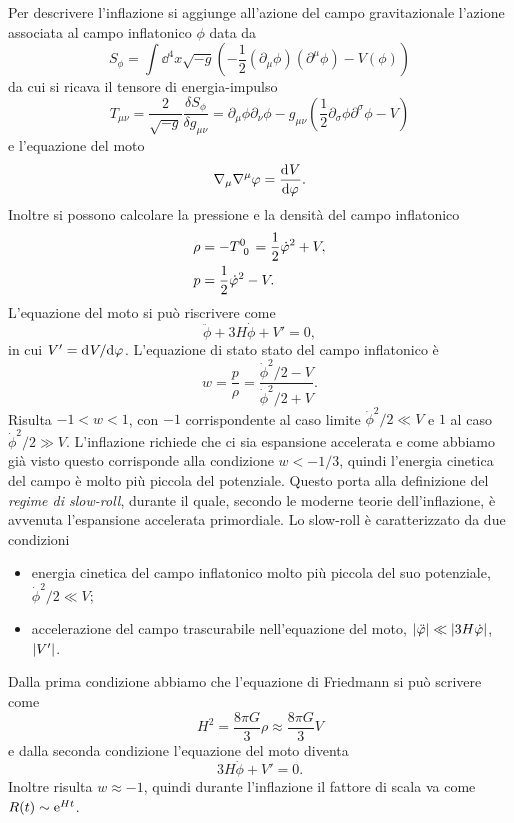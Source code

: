 Per descrivere l'inflazione si aggiunge all'azione del campo gravitazionale
l'azione associata al campo inflatonico \(\phi\) data da
\begin{equation}
  S_{\phi} = \int\dd^{4}x
  \sqrt{-g}\left(-\frac{1}{2}(\partial_{\mu}\phi)(\partial^{\mu}\phi) -
    V(\phi)\right)
\end{equation}
da cui si ricava il tensore di energia-impulso
\begin{equation}
  T_{\mu\nu} = \frac{2}{\sqrt{-g}} \frac{\delta S_{\phi}}{\delta g_{\mu\nu}}
  = \partial_{\mu}\phi \partial_{\nu}\phi -
  g_{\mu\nu}\left(\frac{1}{2}\partial_{\sigma}\phi \partial^{\sigma}\phi -
    V\right)
\end{equation}
e l'equazione del moto
\begin{equation}
  \nabla_{\mu}\nabla^{\mu}\varphi = \frac{{\mathop{}\!\mathrm{d}^{}}V}{\mathop{}\!\mathrm{d} {\varphi}^{}}.
\end{equation}
Inoltre si possono calcolare la pressione e la densità del campo inflatonico
\begin{align}
  \rho &= -\tensor{T}{^{0}_{0}} = \frac{1}{2}\dot{\phi}^{2} + V, \\
  p &= \frac{1}{2}\dot{\phi}^{2} - V.
\end{align}
L'equazione del moto si può riscrivere come
\begin{equation}
  \ddot{\phi} + 3H\dot{\phi} + V' = 0,
\end{equation}
in cui \(V' = \mathrm{d}^{}V / \mathrm{d} {\varphi}^{}\).  L'equazione di stato stato del campo
inflatonico è
\begin{equation}
  w = \frac{p}{\rho} = \frac{\dot{\phi}^{2}/2 - V}{\dot{\phi}^{2}/2 + V}.
\end{equation}
Risulta \(-1<w<1\), con \(-1\) corrispondente al caso limite \(\dot{\phi}^{2}/2
\ll V\) e \(1\) al caso \(\dot{\phi}^{2}/2 \gg V\).  L'inflazione richiede che
ci sia espansione accelerata e come abbiamo già visto questo corrisponde alla
condizione \(w < -1/3\), quindi l'energia cinetica del campo è molto più piccola
del potenziale.  Questo porta alla definizione del \emph{regime di slow-roll},
durante il quale, secondo le moderne teorie dell'inflazione, è avvenuta
l'espansione accelerata primordiale.  Lo slow-roll è caratterizzato da due
condizioni
\begin{itemize}
\item energia cinetica del campo inflatonico molto più piccola del suo
  potenziale, \(\dot{\phi}^{2}/2 \ll V\);
\item accelerazione del campo trascurabile nell'equazione del moto,
  \(\lvert\ddot{\varphi}\rvert\ll \lvert3H\dot{\varphi}\rvert\), \(\lvert V'\rvert\).
\end{itemize}
Dalla prima condizione abbiamo che l'equazione di Friedmann si può scrivere come
\begin{equation}
  H^{2} = \frac{8\pi G}{3}\rho \approx \frac{8\pi G}{3}V
\end{equation}
e dalla seconda condizione l'equazione del moto diventa
\begin{equation}
  3H\dot{\phi} + V' = 0.
\end{equation}
Inoltre risulta \(w \approx -1\), quindi durante l'inflazione il fattore di
scala va come \(R(t)\sim \operatorname{\mathrm{e}}^{Ht}\).

